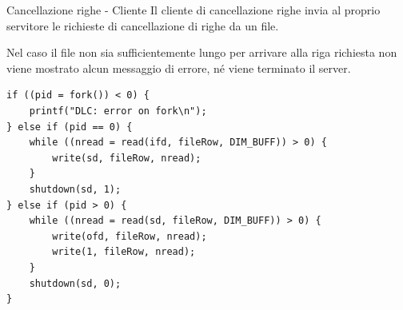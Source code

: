 \documentclass[8pt]{beamer}
\begin{document}
\begin{frame}[fragile]{Cancellazione righe - Cliente}
  Il cliente di cancellazione righe invia al proprio servitore le richieste di cancellazione di righe da un file.

  Nel caso il file non sia sufficientemente lungo per arrivare alla riga richiesta non viene mostrato alcun messaggio di errore, 
  né viene terminato il server. 
  \begin{verbatim}
if ((pid = fork()) < 0) {
    printf("DLC: error on fork\n");
} else if (pid == 0) {
    while ((nread = read(ifd, fileRow, DIM_BUFF)) > 0) {
        write(sd, fileRow, nread);
    }
    shutdown(sd, 1);
} else if (pid > 0) {
    while ((nread = read(sd, fileRow, DIM_BUFF)) > 0) {
        write(ofd, fileRow, nread);
        write(1, fileRow, nread);
    }
    shutdown(sd, 0);
}
  \end{verbatim}
\end{frame}
\end{document}
